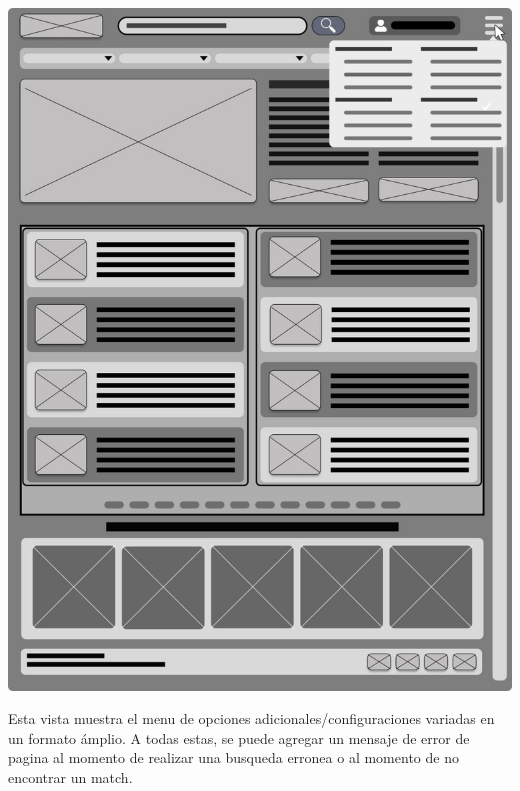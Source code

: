 \documentclass[a4paper,12pt]{article}
\begin{document}
\begin{itemize}
\par \includegraphics[scale=0.85]{m4} \par

Esta vista muestra el menu de opciones adicionales/configuraciones variadas en un formato ámplio. A todas estas, se puede agregar un mensaje de error de pagina al momento de realizar una busqueda erronea o al momento de no encontrar un match.


\end{itemize}
\end{document}
